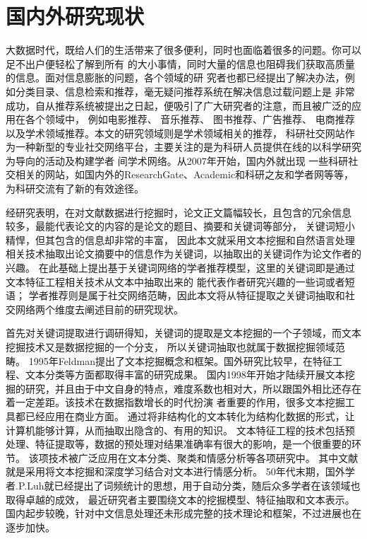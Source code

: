 \section{国内外研究现状}
大数据时代，既给人们的生活带来了很多便利，同时也面临着很多的问题。你可以足不出户便轻松了解到所有%
的大小事情，同时大量的信息也阻碍我们获取高质量的信息。面对信息膨胀的问题，各个领域的研%
究者也都已经提出了解决办法，例如分类目录、信息检索和推荐，毫无疑问推荐系统在解决信息过载问题上是%
非常成功，自从推荐系统被提出之日起，便吸引了广大研究者的注意，而且被广泛的应用在各个领域中，%
例如电影推荐、%
音乐推荐、%
图书推荐、广告推荐、%
电商推荐以及学术领域推荐。本文的研究领域则是学术领域相关的推荐，%
科研社交网站作为一种新型的专业社交网络平台，主要关注的是为科研人员提供在线的以科学研究为导向的活动及构建学者%
间学术网络。从2007年开始，国内外就出现%
一些科研社交相关的网站，如国内外的ResearchGate、Academic和科研之友和学者网等等，%
为科研交流有了新的有效途径。

经研究表明，在对文献数据进行挖掘时，论文正文篇幅较长，且包含的冗余信息%
较多，最能代表论文的内容的是论文的题目、摘要和关键词等部分，%
关键词短小精悍，但其包含的信息却非常的丰富，
因此本文就采用文本挖掘和自然语言处理相关技术抽取出论文摘要中的信息作为关键词，以抽取出的关键词作为论文作者的兴趣。
在此基础上提出基于关键词网络的学者推荐模型，这里的关键词即是通过文本特征工程相关技术从文本中抽取出来的%
能代表作者研究兴趣的一些词或者短语；
学者推荐则是属于社交网络范畴，因此本文将从特征提取之关键词抽取和社交网络两个维度去阐述目前的研究现状。%

首先对关键词提取进行调研得知，关键词的提取是文本挖掘的一个子领域，而文本挖掘技术又是数据挖掘的一个分支，%
所以关键词抽取也就属于数据挖掘领域范畴。
1995年Feldman提出了文本挖掘概念和框架。国外研究比较早，在特征工程、文本分类等方面都取得丰富的研究成果。%
国内1998年开始才陆续开展文本挖掘的研究，并且由于中文自身的特点，难度系数也相对大，所以跟国外相比还存在%
着一定差距。该技术在数据指数增长的时代扮演%
者重要的作用，很多文本挖掘工具都已经应用在商业方面。%
通过将非结构化的文本转化为结构化数据的形式，让计算机能够计算，从而抽取出隐含的、有用的知识。%
文本特征工程的技术包括预处理、特征提取等，数据的预处理对结果准确率有很大的影响，是一个很重要的环节。%
该项技术被广泛应用在文本分类、聚类和情感分析等各项研究中。%
其中文献就是采用将文本挖掘和深度学习结合对文本进行情感分析。%
50年代末期，国外学者.P.Luh就已经提出了词频统计的思想，用于自动分类，随后众多学者在该领域也取得卓越的成效，%
最近研究者主要围绕文本的挖掘模型、特征抽取和文本表示。%
国内起步较晚，针对中文信息处理还未形成完整的技术理论和框架，不过进展也在逐步加快。

